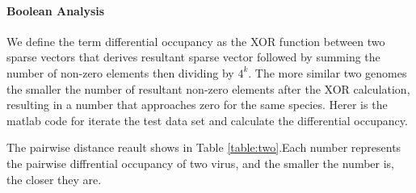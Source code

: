 \documentclass[12pt]{article}
\newcommand{\sailfish}{Sailfish\xspace}
\begin{document}
 

\paragraph{Boolean Analysis} We define the term differential occupancy as the XOR function between two sparse vectors that derives resultant sparse vector followed by summing the number of non-zero elements then dividing by $4^k$. The more similar two genomes the smaller the number of resultant non-zero elements after the XOR calculation, resulting in a number that approaches zero for the same species. Herer is the matlab code for iterate the test data set and calculate the differential occupancy.


\noindent The pairwise distance reault shows in Table \ref{table:two}.Each number represents the pairwise diffrential occupancy of two virus, and the smaller the number is, the closer they are.


\newpage 
%



\newpage


\end{document}
